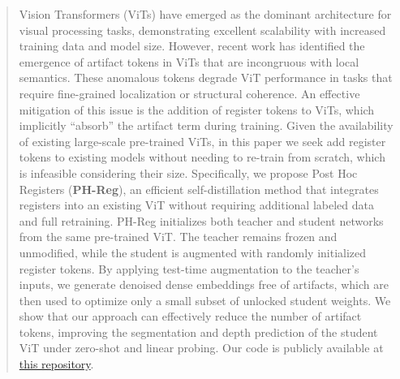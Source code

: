 \documentclass{article}
\begin{document}
\noindent{}
\noindent{}

\begin{abstract}
Vision Transformers (ViTs) have emerged as the dominant architecture for visual processing tasks, demonstrating excellent scalability with increased training data and model size. However, recent work has identified the emergence of artifact tokens in ViTs that are incongruous with local semantics. These anomalous tokens degrade ViT performance in tasks that require fine-grained localization or structural coherence. 
An effective mitigation of this issue is the addition of register tokens to ViTs, which implicitly ``absorb'' the artifact term during training. Given the availability of existing large-scale pre-trained ViTs, in this paper we seek add register tokens to existing models without needing to re-train from scratch, which is infeasible considering their size. Specifically, we propose Post Hoc Registers (\textbf{PH-Reg}), an efficient self-distillation method that integrates registers into an existing ViT without requiring additional labeled data and full retraining. PH-Reg initializes both teacher and student networks from the same pre-trained ViT. The teacher remains frozen and unmodified, while the student is augmented with randomly initialized register tokens. By applying test-time augmentation to the teacher's inputs, we generate denoised dense embeddings free of artifacts, which are then used to optimize only a small subset of unlocked student weights. We show that our approach can effectively reduce the number of artifact tokens, improving the segmentation and depth prediction of the student ViT under zero-shot and linear probing. Our code is publicly available at \href{https://github.com/0raiser0/PH-Reg}{this repository}.
\end{abstract}
 \vspace{-.1cm}
\end{document}
